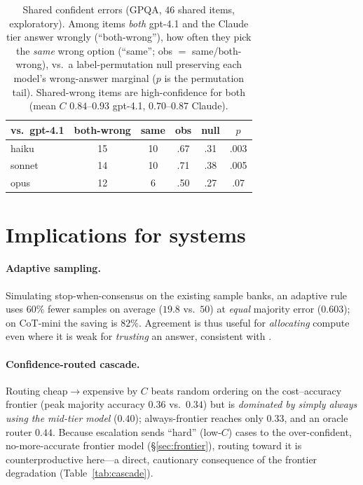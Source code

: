 \documentclass[11pt]{article}
\newcommand{\C}{\textit{C}}
\begin{document}
\begin{table}[t]
\centering\footnotesize
\setlength{\tabcolsep}{4pt}
\begin{tabular}{@{}lccccc@{}}
\toprule
vs.\ gpt-4.1 & both-wrong & same & obs & null & $p$ \\
\midrule
haiku  & 15 & 10 & .67 & .31 & .003 \\
sonnet & 14 & 10 & .71 & .38 & .005 \\
opus   & 12 & \phantom{0}6 & .50 & .27 & .07\phantom{0} \\
\bottomrule
\end{tabular}
\caption{Shared confident errors (GPQA, $46$ shared items, exploratory). Among items \emph{both} gpt-4.1
and the Claude tier answer wrongly (``both-wrong''), how often they pick the \emph{same} wrong option
(``same''; obs $=$ same/both-wrong), vs.\ a label-permutation null preserving each model's wrong-answer
marginal ($p$ is the permutation tail). Shared-wrong items are high-confidence for both (mean $\C$
$0.84$--$0.93$ gpt-4.1, $0.70$--$0.87$ Claude).}
\label{tab:shared}
\end{table}

\section{Implications for systems}
\label{sec:systems}
\paragraph{Adaptive sampling.} Simulating stop-when-consensus on the existing sample banks, an adaptive
rule uses $60\%$ fewer samples on average ($19.8$ vs.\ $50$) at \emph{equal} majority error ($0.603$);
on CoT-mini the saving is $82\%$. Agreement is thus useful for \emph{allocating} compute even where it
is weak for \emph{trusting} an answer, consistent with \citet{aggarwal2023adaptive}.
\paragraph{Confidence-routed cascade.} Routing cheap$\to$expensive by $\C$ \citep{chen2023frugalgpt}
beats random ordering on the cost--accuracy frontier (peak majority accuracy $0.36$ vs.\ $0.34$) but is
\emph{dominated by simply always using the mid-tier model} ($0.40$); always-frontier reaches only
$0.33$, and an oracle router $0.44$. Because escalation sends ``hard'' (low-$\C$) cases to the
over-confident, no-more-accurate frontier model (\S\ref{sec:frontier}), routing toward it is
counterproductive here---a direct, cautionary consequence of the frontier degradation (Table~\ref{tab:cascade}).
\end{document}
